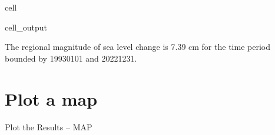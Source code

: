 \documentclass[letterpaper,10pt,english]{jupyterBook}
\begin{document}
\begin{sphinxuseclass}{cell}
\begin{sphinxVerbatimOutput}
\begin{sphinxuseclass}{cell_output}
\begin{sphinxVerbatim}[commandchars=\\\{\}]
The regional magnitude of sea level change is 7.39 cm for the time period bounded by 1993\PYGZhy{}01\PYGZhy{}01 and 2022\PYGZhy{}12\PYGZhy{}31.
\end{sphinxVerbatim}

\end{sphinxuseclass}\end{sphinxVerbatimOutput}

\end{sphinxuseclass}

\chapter{Plot a map}
\label{\detokenize{notebooks/regional_and_local/SL_Trend:plot-a-map}}
\sphinxAtStartPar
Plot the Results – MAP
\end{document}
